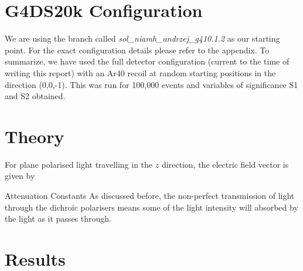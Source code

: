 \documentclass[11pt]{article} %
\begin{document}
\section{G4DS20k Configuration}
\label{intro}

We are using the branch called \textit{sol\_niamh\_andrzej\_g410.1.2} as our starting point. For the exact configuration details please refer to the appendix.
To summarize, we have used the full detector configuration (current to the time of writing this report) with an Ar40 recoil at random starting positions in the direction (0,0,-1).
This was run for 100,000 events and variables of significance S1 and S2 obtained.

\section{Theory}
 For plane polarised light travelling in the $z$ direction, the electric field vector is given by


\begin{subsection}{Attenuation Constants}
As discussed before, the non-perfect transmission of light through the dichroic polarisers means some of the light intensity will absorbed by the light as it passes through.
\end{subsection}

\section{Results}



\end{document}
